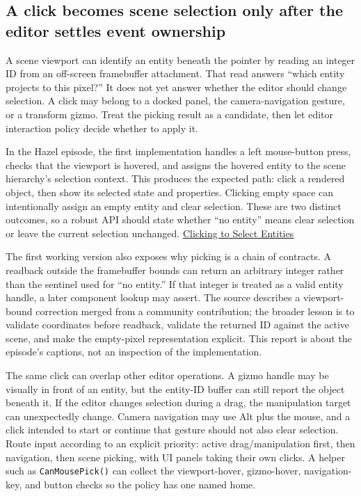 \subsection{A click becomes scene selection only after the editor settles event ownership}\label{06-engine-ii-ch032-a-click-becomes-scene-selection-only-after-the-editor-settles-event-ownership}

\hypertarget{06-engine-ii-ch032-a-click-becomes-scene-selection-only-after-the-editor-settles-event-ownership}{}

A scene viewport can identify an entity beneath the pointer by reading an integer ID from an off-screen framebuffer attachment. That read answers ``which entity projects to this pixel?'' It does not yet answer whether the editor should change selection. A click may belong to a docked panel, the camera-navigation gesture, or a transform gizmo. Treat the picking result as a candidate, then let editor interaction policy decide whether to apply it.

In the Hazel episode, the first implementation handles a left mouse-button press, checks that the viewport is hovered, and assigns the hovered entity to the scene hierarchy's selection context. This produces the expected path: click a rendered object, then show its selected state and properties. Clicking empty space can intentionally assign an empty entity and clear selection. These are two distinct outcomes, so a robust API should state whether ``no entity'' means clear selection or leave the current selection unchanged. \href{https://www.youtube.com/watch?v=CU9v3uUgRaE}{Clicking to Select Entities}

The first working version also exposes why picking is a chain of contracts. A readback outside the framebuffer bounds can return an arbitrary integer rather than the sentinel used for ``no entity.'' If that integer is treated as a valid entity handle, a later component lookup may assert. The source describes a viewport-bound correction merged from a community contribution; the broader lesson is to validate coordinates before readback, validate the returned ID against the active scene, and make the empty-pixel representation explicit. This report is about the episode's captions, not an inspection of the implementation.

The same click can overlap other editor operations. A gizmo handle may be visually in front of an entity, but the entity-ID buffer can still report the object beneath it. If the editor changes selection during a drag, the manipulation target can unexpectedly change. Camera navigation may use Alt plus the mouse, and a click intended to start or continue that gesture should not also clear selection. Route input according to an explicit priority: active drag/manipulation first, then navigation, then scene picking, with UI panels taking their own clicks. A helper such as \texttt{CanMousePick()} can collect the viewport-hover, gizmo-hover, navigation-key, and button checks so the policy has one named home.

